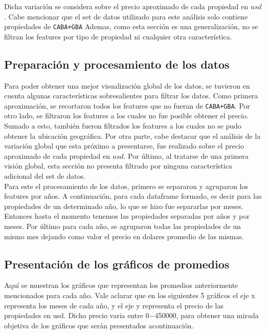 \documentclass[a4paper, 10pt]{article}
\def\code#1{\texttt{#1}}
\begin{document}
        Dicha variación se considera sobre el precio aproximado de cada propiedad en $usd$. Cabe mencionar que el set de datos utilizado para este análisis solo contiene propiedades de \code{CABA+GBA} Ademas, como esta sección es una generalización, no se filtran los features por tipo de propiedad ni cualquier otra  característica.

      \subsection{Preparación y procesamiento de los datos}

        Para poder obtener una mejor visualización global de los datos, se tuvieron en cuenta algunas características sobresalientes para filtrar los datos. Como primera aproximación, se recortaron todos los features que no fueran
        de \code{CABA+GBA}. Por otro lado, se filtraron los features a los cuales no fue posible obtener el precio. Sumado a esto, también fueron filtrados los features a los cuales no se pudo obtener la ubicación geográfica.
        Por otra parte, cabe destacar que el análisis de la variación global que esta próximo a presentarse, fue realizado sobre el precio aproximado de cada propiedad en $usd$. Por último, al tratarse de una primera visión global, esta sección no presenta filtrado por ninguna característica adicional del set de datos.
        \\
        Para este el procesamiento de los datos, primero se separaron y agruparon los features por años. A continuación, para cada dataframe formado, es decir para las propiedades de un determinado año, lo que se hizo fue separarlas por meses. Entonces hasta el momento tenemos las propiedades separadas por años y por meses. Por último para cada año, se agruparon todas las propiedades de un mismo mes dejando como valor el precio en dolares promedio de las mismas.

      \subsection{Presentación de los gráficos de promedios}

        Aquí se muestran los gráficos que representan los promedios anteriormente mencionados para cada año.
        Vale aclarar que en los siguientes 5 gráficos el eje x representa los meses de cada año, y el eje y representa el precio de las propiedades en usd. Dicho precio varia entre 0$-$450000, para obtener una mirada objetiva de los gráficos que serán presentados acontinuación.
\end{document}
